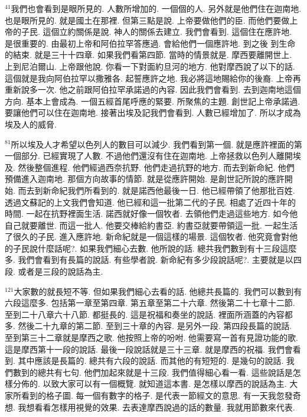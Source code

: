 \documentclass{book}
\begin{document}
$^{41}$我們也會看到是眼所見的.
人數所增加的.
一個個的人.
另外就是他們住在迦南地.
也是眼所見的.
就是國土在那裡.
但第三點是說.
上帝要做他們的臣.
而他們要做上帝的子民.
這個立約關係是說.
神人的關係去建立.
我們會看到.
這個住在應許地.
是很重要的.
由最初上帝和阿伯拉罕答應過.
會給他們一個應許地.
到之後 到生命的結束.
就是三十十四章.
如果我們看第四節.
當時的情景就是.
摩西要離開世上.
上到尼泊爾山.
上帝跟他說.
你看一下對面約旦河的地方.
他對摩西說了以下的話.
這個就是我向阿伯拉罕以撒雅各.
起誓應許之地.
我必將這地賜給你的後裔.
上帝再重新說多一次.
他之前跟阿伯拉罕承諾過的內容.
因此我們會看到.
去到迦南地這個方向.
基本上會成為.
一個五經首尾呼應的緊要.
所聚焦的主題.
創世記上帝承諾過.
要讓他們可以住在迦南地.
接著出埃及記我們會看到.
人數已經增加了.
所以才成為埃及人的威脅.

$^{81}$所以埃及人才希望以色列人的數目可以減少.
我們看到第一個.
就是應許裡面的第一個部分.
已經實現了人數.
不過他們還沒有住在迦南地.
上帝拯救以色列人離開埃及.
然後整個進程.
他們經過西奈抗野.
他們走過抗野的地方.
而去到新命紀.
他們預備進入迦南地.
那個方向故事的情節.
就是從應許開始.
是創世記所說的應許開始.
而去到新命紀我們所看到的.
就是諾西他最後一日.
他已經帶領了他那批百姓.
透過文蘇記的上文我們會知道.
他已經和這一批第二代的子民.
相處了近四十年的時間.
一起在抗野裡面生活.
諾西就好像一個牧者.
去領他們走過這些地方.
如今他自己就要離世.
而這一批人.
他要交棒給約書亞.
約書亞就要帶領這一批.
一起生活了很久的子民.
進入應許地.
新命紀就是一個這樣的場景.
這個牧者.
他究竟會對他的子民說什麼話呢?.
如果我們細心去數.
他所說的話.
總共我們數到有十三段這麼多.
我們會看到有長篇的說話.
有些學者說.
新命紀有多少段說話呢?.
主要就是以四段.
或者是三段的說話為主.

$^{121}$大家數的就長短不等.
但如果我們細心去看的話.
他總共長篇的.
我們可以數到有六段這麼多.
包括第一章至第四章.
第五章至第二十六章.
然後第二十七章十二節.
至到二十八章六十八節.
都挺長的.
這是祝福和奏坐的說話.
裡面所涵蓋的內容都多.
然後二十九章的第二節.
至到三十章的內容.
是另外一段.
第四段長篇的說話.
至到第三十二章就是摩西之歌.
他按照上帝的吩咐.
他需要寫一首有見證功能的歌.
這是摩西第十一段的說話.
最後一段說話就是三十三章.
就是摩西的祝福.
我們會看到.
其中應該是長篇的.
總共有六段的說話.
而其他的有短短的.
是幾句的說話.
我們數到的總共有七句.
他們加起來就是十三段.
我們值得細心看一看.
這些說話是怎樣分佈的.
以致大家可以有一個概覽.
就知道這本書.
是怎樣以摩西的說話為主.
大家所看到的格子圖.
每一個有數字的格子.
是代表一節經文的意思.
有一天我忽發奇想.
我想看看怎樣用視覺的效果.
去表達摩西說過的話的數量.
我就用節數來代表.
\end{document}
